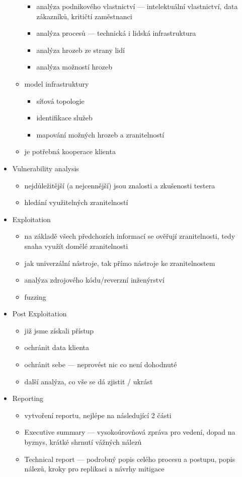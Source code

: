 \begin{itemize}
\begin{itemize}
\begin{itemize}
		\item analýza podnikového vlastnictví --- intelektuální vlastnictví, data zákazníků, kritičtí zaměstnanci
		\item analýza procesů --- technická i lidská infrastruktura
		\item analýza hrozeb ze strany lidí
		\item analýza možností hrozeb
		\end{itemize}
		\item model infrastruktury
		\begin{itemize}
		\item síťová topologie
		\item identifikace služeb
		\item mapování možných hrozeb a zranitelností
		\end{itemize}
		\item je potřebná kooperace klienta
	\end{itemize}
	\item Vulnerability analysis
	\begin{itemize}
		\item nejdůležitější (a nejcennější) jsou znalosti a zkušenosti testera
		\item hledání využitelných zranitelností
	\end{itemize}
	\item Exploitation
	\begin{itemize}
		\item na základě všech předchozích informací se ověřují zranitelnosti, tedy snaha využít domělé zranitelnosti
		\item jak univerzální nástroje, tak přímo nástroje ke zranitelnostem
		\item analýza zdrojového kódu/reverzní inženýrství
		\item fuzzing
	\end{itemize}
	\item Post Exploitation
	\begin{itemize}
		\item již jsme získali přístup
		\item ochránit data klienta
		\item ochránit sebe --- neprovést nic co není dohodnuté
		\item další analýza, co vše se dá zjistit / ukrást
	\end{itemize}
	\item Reporting
	\begin{itemize}
		\item vytvoření reportu, nejlépe na následující 2 části
		\item Executive summary --- vysokoúrovňová zpráva pro vedení, dopad na byznys, krátké shrnutí vážných nálezů
		\item Technical report --- podrobný popis celého procesu a postupu, popis nálezů, kroky pro replikaci a návrhy mitigace
	\end{itemize}
\end{itemize}

